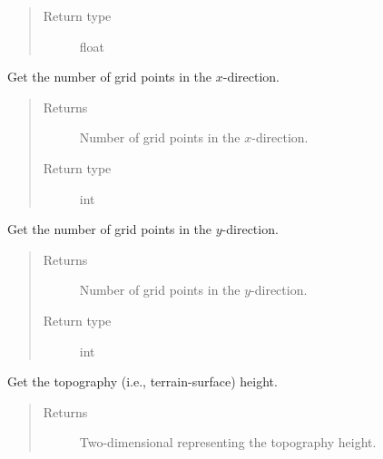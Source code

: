 \documentclass[letterpaper,10pt,english]{sphinxmanual}
\begin{document}
\begin{fulllineitems}
\begin{fulllineitems}
\begin{quote}
\begin{description}
\item[{Return type}] \leavevmode
float

\end{description}\end{quote}

\end{fulllineitems}


\begin{fulllineitems}
\label{\detokenize{api:tasmania.grids.grid_xyz.GridXYZ.nx}}
Get the number of grid points in the \(x\)-direction.
\begin{quote}\begin{description}
\item[{Returns}] \leavevmode
Number of grid points in the \(x\)-direction.

\item[{Return type}] \leavevmode
int

\end{description}\end{quote}

\end{fulllineitems}


\begin{fulllineitems}
\label{\detokenize{api:tasmania.grids.grid_xyz.GridXYZ.ny}}
Get the number of grid points in the \(y\)-direction.
\begin{quote}\begin{description}
\item[{Returns}] \leavevmode
Number of grid points in the \(y\)-direction.

\item[{Return type}] \leavevmode
int

\end{description}\end{quote}

\end{fulllineitems}


\begin{fulllineitems}
\label{\detokenize{api:tasmania.grids.grid_xyz.GridXYZ.topography_height}}
Get the topography (i.e., terrain-surface) height.
\begin{quote}\begin{description}
\item[{Returns}] \leavevmode
Two-dimensional  representing the topography height.


\end{description}
\end{quote}
\end{fulllineitems}
\end{fulllineitems}
\end{document}
